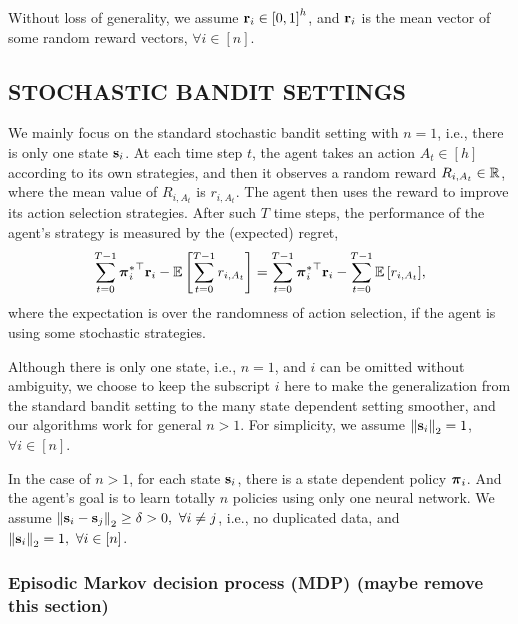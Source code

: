 Without loss of generality, we assume ${\mathbf{r}}_i \in \left[ 0, 1 \right]^h$, and ${\mathbf{r}}_i$ is the mean vector of some random reward vectors,  $\forall i \in [n]$.

\subsection{STOCHASTIC BANDIT SETTINGS}
\label{subsec:settings}

We mainly focus on the standard stochastic bandit setting with $n = 1$, i.e., there is only one state ${\mathbf{s}}_i$. At each time step $t$, the agent takes an action $A_t \in [h]$ according to its own strategies, and then it observes a random reward $R_{i, A_t} \in {\mathbb{R}}$, where the mean value of $R_{i, A_t}$ is $r_{i, A_t}$. The agent then uses the reward to improve its action selection strategies. After such $T$ time steps, the performance of the agent's strategy is measured by the (expected) regret,
\begin{equation}
\label{eq:expected_regret}
    \sum\limits_{t=0}^{T-1}{{{\boldsymbol{\pi}}_i^*}^\top {\mathbf{r}}_i} - {\mathbb{E}} \left[ \sum\limits_{t=0}^{T-1}{  r_{i, A_t}  } \right] = \sum\limits_{t=0}^{T-1}{{{\boldsymbol{\pi}}_i^*}^\top {\mathbf{r}}_i} - \sum\limits_{t=0}^{T-1}{ {\mathbb{E}} \left[ r_{i, A_t} \right] },
\end{equation}
where the expectation is over the randomness of action selection, if the agent is using some stochastic strategies.

Although there is only one state, i.e., $n = 1$, and $i$ can be omitted without ambiguity, we choose to keep the subscript $i$ here to make the generalization from the standard bandit setting to the many state dependent setting smoother, and our algorithms work for general $n > 1$. For simplicity, we assume $\left\| {\mathbf{s}}_{i} \right\|_2 = 1$, $\forall i \in [n]$.

In the case of $n > 1$, for each state ${\mathbf{s}}_i$, there is a state dependent policy ${\boldsymbol{\pi}}_i$. And the agent's goal is to learn totally $n$ policies using only one neural network. We assume $\left\| {\mathbf{s}}_{i} -  {\mathbf{s}}_{j} \right\|_2 \ge \delta > 0 , \ \forall i \not= j$, i.e., no duplicated data, and $\left\| {\mathbf{s}}_{i} \right\|_2 = 1, \ \forall i \in [n]$.

\subsubsection{Episodic Markov decision process (MDP) (maybe remove this section)}

